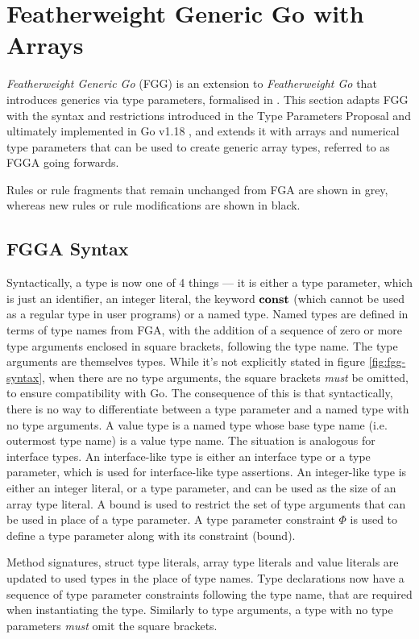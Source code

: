 \section{Featherweight Generic Go with Arrays}

\emph{Featherweight Generic Go} (FGG) is an extension to \emph{Featherweight Go}
that introduces generics via type parameters, formalised in \autocite{fg}. This
section adapts FGG with the syntax and restrictions introduced in the Type
Parameters Proposal and ultimately implemented in Go v1.18
\autocite{genericsProposal}, and extends it with arrays and numerical type
parameters that can be used to create generic array types, referred to as FGGA
going forwards.

Rules or rule fragments that remain unchanged from FGA are shown in grey,
whereas new rules or rule modifications are shown in black.

\subsection{FGGA Syntax}

Syntactically, a type is now one of 4 things --- it is either a type parameter,
which is just an identifier, an integer literal, the keyword $\texttt{\bf const}$ (which
cannot be used as a regular type in user programs) or a named type. Named types
are defined in terms of type names from FGA, with the addition of a sequence of
zero or more type arguments enclosed in square brackets, following the type
name. The type arguments are themselves types. While it's not explicitly stated
in figure \ref{fig:fgg-syntax}, when there are no type arguments, the square
brackets \emph{must} be omitted, to ensure compatibility with Go. The
consequence of this is that syntactically, there is no way to differentiate
between a type parameter and a named type with no type arguments. A value type
is a named type whose base type name (i.e. outermost type name) is a value type
name. The situation is analogous for interface types. An interface-like type is
either an interface type or a type parameter, which is used for interface-like
type assertions. An integer-like type is either an integer literal, or a type
parameter, and can be used as the size of an array type literal. A bound is used
to restrict the set of type arguments that can be used in place of a type
parameter. A type parameter constraint $\Phi$ is used to define a type parameter
along with its constraint (bound).

Method signatures, struct type literals, array type literals and value literals
are updated to used types in the place of type names. Type declarations now have
a sequence of type parameter constraints following the type name, that are
required when instantiating the type. Similarly to type arguments, a type with
no type parameters \emph{must} omit the square brackets.

